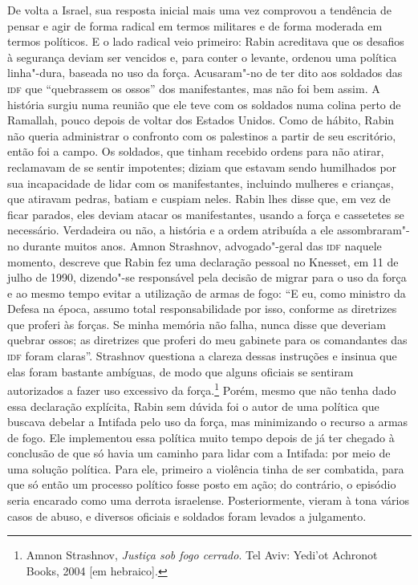 De volta a Israel, sua resposta inicial mais uma vez comprovou a
tendência de pensar e agir de forma radical em termos militares e de
forma moderada em termos políticos. E o lado radical veio primeiro: Rabin
acreditava que os desafios à segurança deviam ser vencidos e, para
conter o levante, ordenou uma política linha"-dura, baseada no uso da
força. Acusaram"-no de ter dito aos soldados das \textsc{idf} que ``quebrassem os
ossos'' dos manifestantes, mas não foi bem assim. A história surgiu numa
reunião que ele teve com os soldados numa colina perto de Ramallah,
pouco depois de voltar dos Estados Unidos. Como de hábito, Rabin não
queria administrar o confronto com os palestinos a partir de seu
escritório, então foi a campo. Os soldados, que tinham recebido ordens
para não atirar, reclamavam de se sentir impotentes; diziam que estavam
sendo humilhados por sua incapacidade de lidar com os manifestantes,
incluindo mulheres e crianças, que atiravam pedras, batiam e cuspiam
neles. Rabin lhes disse que, em vez de ficar parados, eles deviam atacar os
manifestantes, usando a força e cassetetes se necessário. Verdadeira ou
não, a história e a ordem atribuída a ele assombraram"-no durante muitos
anos. Amnon Strashnov, advogado"-geral das \textsc{idf} naquele momento, descreve
que Rabin fez uma declaração pessoal no Knesset, em 11 de julho de 1990,
dizendo"-se responsável pela decisão de migrar para o uso da força e ao
mesmo tempo evitar a utilização de armas de fogo: ``E eu, como ministro
da Defesa na época, assumo total responsabilidade por isso, conforme as
diretrizes que proferi às forças. Se minha memória não falha, nunca
disse que deveriam quebrar ossos; as diretrizes que proferi do meu
gabinete para os comandantes das \textsc{idf} foram claras''. Strashnov questiona
a clareza dessas instruções e insinua que elas foram bastante ambíguas,
de modo que alguns oficiais se sentiram autorizados a fazer uso
excessivo da força.\footnote{Amnon Strashnov, \textit{Justiça sob fogo cerrado}.
  Tel Aviv: Yedi'ot Achronot Books, 2004 {[}em hebraico{]}.} Porém, mesmo
que não tenha dado essa declaração explícita, Rabin sem dúvida foi o
autor de uma política que buscava debelar a Intifada pelo uso da força,
mas minimizando o recurso a armas de fogo. Ele implementou
essa política muito tempo depois de já ter chegado à conclusão de que só
havia um caminho para lidar com a Intifada: por meio de uma solução
política. Para ele, primeiro a violência tinha de ser combatida, para
que só então um processo político fosse posto em ação; do contrário, o
episódio seria encarado como uma derrota israelense. Posteriormente,
vieram à tona vários casos de abuso, e diversos oficiais e soldados
foram levados a julgamento.

